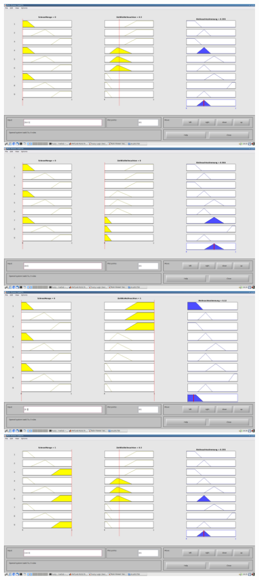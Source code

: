 \includegraphics[width=\textwidth]{part/screenshots/fuzzy-17c-K08-0-0,3}
\includegraphics[width=\textwidth]{part/screenshots/fuzzy-17c-K08-0-0}
\includegraphics[width=\textwidth]{part/screenshots/fuzzy-17c-K08-0-1}
\includegraphics[width=\textwidth]{part/screenshots/fuzzy-17c-K08-1-0,3}

